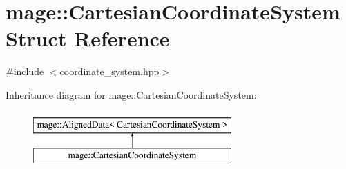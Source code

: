 \hypertarget{structmage_1_1_cartesian_coordinate_system}{}\section{mage\+:\+:Cartesian\+Coordinate\+System Struct Reference}
\label{structmage_1_1_cartesian_coordinate_system}


{\ttfamily \#include $<$coordinate\+\_\+system.\+hpp$>$}

Inheritance diagram for mage\+:\+:Cartesian\+Coordinate\+System\+:\begin{figure}[H]
\begin{center}
\leavevmode
\includegraphics[height=2.000000cm]{structmage_1_1_cartesian_coordinate_system}
\end{center}
\end{figure}
